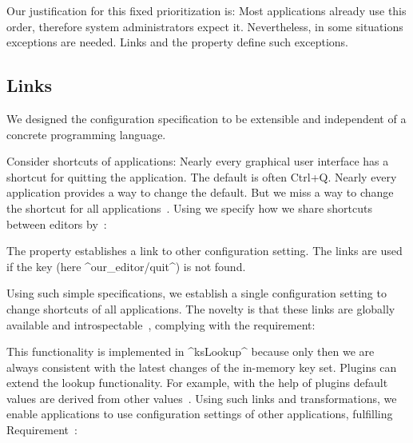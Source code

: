 Our justification for this fixed prioritization is:
Most applications already use this order, therefore system administrators expect it.
Nevertheless, in some situations exceptions are needed.
Links and the property  define such exceptions.


\subsection{Links}
\label{sec:backend-links}

We designed the configuration specification to be extensible and independent of a concrete programming language.

\begin{example}
\label{ex:shortcut}
Consider shortcuts of applications:
Nearly every graphical user interface has a shortcut for quitting the application.
The default is often Ctrl+Q.
Nearly every application provides a way to change the default.
But we miss a way to change the shortcut for all applications~\cite{raab2015kps}.
Using \elektra{} we specify how we share shortcuts between editors by~\cite{raab2015kps}:



The property  establishes a link to other configuration setting.
The links are used if the key (here ^our_editor/quit^) is not found.
\end{example}

Using such simple specifications, we establish a single configuration setting to change shortcuts of all applications.
The novelty is that these links are globally available and introspectable~\cite{raab2015kps}, complying with the requirement:
\reqIntrospection*

This functionality is implemented in ^ksLookup^ because only then we are always consistent with the latest changes of the in-memory key set.
Plugins can extend the lookup functionality.
For example, with the help of plugins default values are derived from other values~\cite{raab2015kps}.
Using such links and transformations, we enable applications to use configuration settings of other applications, fulfilling Requirement~:
\reqIntegration*


